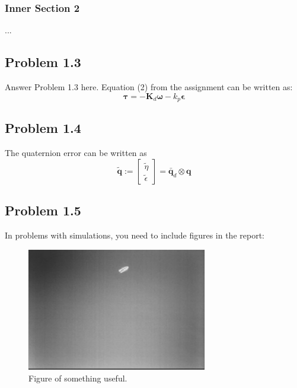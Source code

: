 \subsubsection{Inner Section 2}
...

\subsection{Problem 1.3}
Answer Problem 1.3 here. Equation (2) from the assignment can be written as:
\begin{equation}
  \label{eq:tau}
  \mathbf{\tau} = -\mathbf{K}_d \boldsymbol{\omega} - k_p \boldsymbol{\epsilon}
\end{equation}

\subsection{Problem 1.4}
The quaternion error can be written as
 \begin{equation}
	 \tilde{\mathbf{q}} := \left[
	 \begin{array}{c}
		 \tilde{\eta} \\
		 \tilde{\epsilon}
	 \end{array}
	 \right] = \bar{\mathbf{q}}_d \otimes \mathbf{q}
 \end{equation}

\subsection{Problem 1.5}
In problems with simulations, you need to include figures in the report:
\begin{figure}[ht]
	\centering
	\includegraphics[width=0.7\textwidth]{fig1} %
	\caption{Figure of something useful.}
	\label{fig:fig1}
\end{figure}

